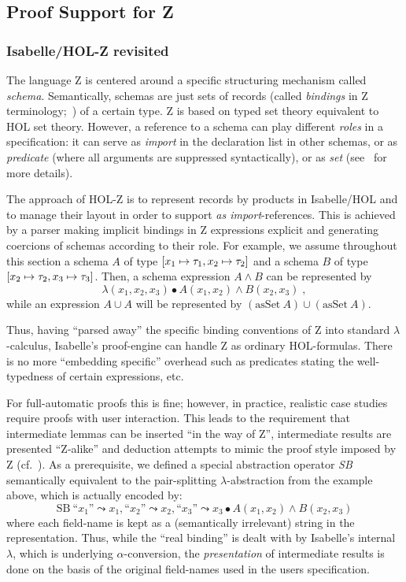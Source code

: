 {\subsection{Proof Support for Z}
\subsubsection{Isabelle/HOL-Z revisited}
The language Z is centered around a specific structuring mechanism
called \emph{schema}. Semantically, schemas are just
sets of records (called \emph{bindings} in Z
terminology;~\cite{iso:z:2000}) of a certain type.  Z is based on
typed set theory equivalent to HOL set theory. However, a reference to
a schema can play different \emph{roles} in a specification: it can
serve as \emph{import} in the declaration list in other schemas, or as
\emph{predicate} (where all arguments are suppressed syntactically),
or as \emph{set} (see~\cite{kolyang.ea:z:96} for more details).

The approach of HOL-Z is to represent records by products in Isabelle/HOL and to
manage their layout in order to support \emph{as import}-references. This is
achieved by a parser making implicit bindings in Z expressions explicit and
generating coercions of schemas according to their role. For example, we assume
throughout this section a schema $A$ of type $[ x_1 \mapsto \tau_1, x_2
\mapsto \tau_2]$ and a schema $B$ of type $[ x_2 \mapsto \tau_2, x_3 \mapsto
\tau_3]$. Then, a schema expression $A \land B$ can be represented by
\[ \lambda (x_1,x_2,x_3)\bullet A(x_1,x_2) \land B(x_2,x_3)\;, \]
while an expression $A \cup A$ will be represented by 
$(\mathrm{asSet}~A) \cup (\mathrm{asSet}~A)$.

Thus, having ``parsed away'' the specific binding conventions of Z into standard
$\lambda$-calculus, Isabelle's proof-engine can handle Z as ordinary
HOL-formulas. There is no more ``embedding specific'' overhead such as
predicates stating the well-typedness of certain expressions, etc.

For full-automatic proofs this is fine; however, in practice, realistic case
studies require proofs with user interaction. This leads to the requirement that
intermediate lemmas can be inserted ``in the way of Z'', intermediate results
are presented ``Z-alike'' and deduction attempts to mimic the proof style
imposed by Z (cf.~\cite{woodcock.ea:using:1996}). As a prerequisite, we defined
a special abstraction operator \emph{SB} semantically equivalent to the
pair-splitting $\lambda$-abstraction from the example above, which is actually
encoded by:
\[
  \mathrm{SB}~\mbox{``$x_1$''} \leadsto x_1, \mbox{``$x_2$''} \leadsto x_2, 
  \mbox{``$x_3$''} \leadsto x_3\bullet A(x_1,x_2) \land B(x_2,x_3) 
\]
where each field-name is kept as a (semantically irrelevant) string in the
representation. Thus, while the ``real binding'' is dealt with by Isabelle's
internal $\lambda$, which is underlying $\alpha$-conversion, the
\emph{presentation} of intermediate results is done on the basis of the original
field-names used in the users specification.

}
